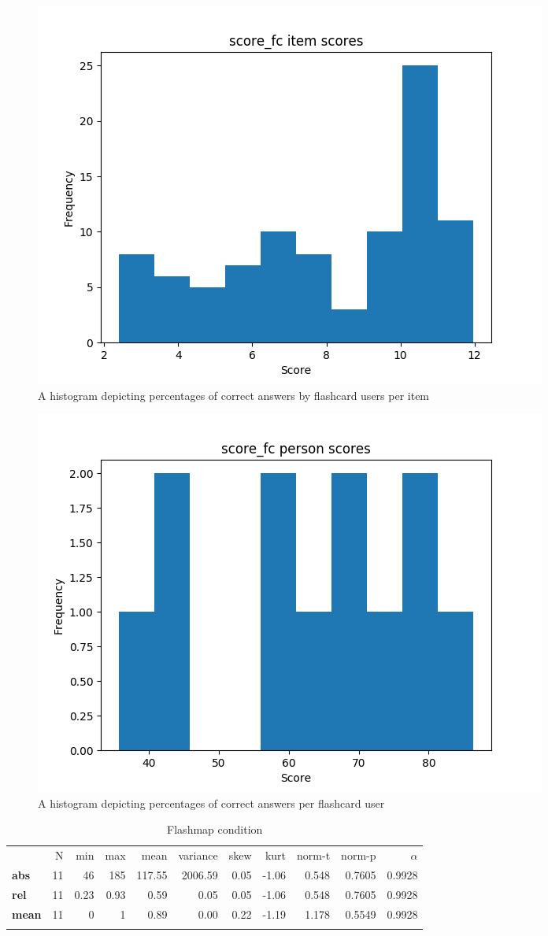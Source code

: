 \begin{figure}
    \centering
    \includegraphics[width=.7\textwidth]{img/score_fc_diff.png}
    \caption{A histogram depicting percentages of correct answers by flashcard users per item}
    \label{fig:score_fc_diff}
\end{figure}
\begin{figure}
    \centering
    \includegraphics[width=.7\textwidth]{img/score_fc_abil.png}
    \caption{A histogram depicting percentages of correct answers per flashcard user}
    \label{fig:score_fc_abil}
\end{figure}

\begin{longtable}[c]{@{}lrrrrrrrrrr@{}}
\caption{Flashmap condition}
\endfirsthead
\toprule\addlinespace
& N & min & max & mean & variance & skew & kurt & norm-t &
norm-p & $\alpha$
\\\addlinespace
\midrule
\textbf{abs} & 11 & 46 & 185 & 117.55 & 2006.59 & 0.05 & -1.06 & 0.548 &
0.7605 & 0.9928
\\\addlinespace
\textbf{rel} & 11 & 0.23 & 0.93 & 0.59 & 0.05 & 0.05 & -1.06 & 0.548 & 0.7605
& 0.9928
\\\addlinespace
\textbf{mean} & 11 & 0 & 1 & 0.89 & 0.00 & 0.22 & -1.19 & 1.178 & 0.5549
& 0.9928
\\\addlinespace
\bottomrule
    \label{tab:score_fm}
\end{longtable}

